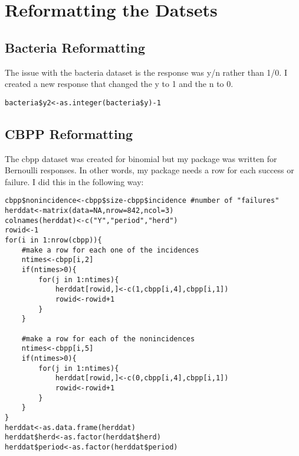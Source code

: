 \documentclass{article}
\begin{document}
\section{Reformatting the Datsets}
\subsection{Bacteria Reformatting}
The issue with the bacteria dataset is the response was y/n rather than 1/0. I created a new response that changed the y to 1 and the n to 0.

\begin{verbatim}
bacteria$y2<-as.integer(bacteria$y)-1
\end{verbatim}
\subsection{CBPP Reformatting}
The cbpp dataset was created for binomial but my package was written for Bernoulli responses. In other words, my package needs a row for each success or failure. I did this in the following way:
\begin{verbatim}
cbpp$nonincidence<-cbpp$size-cbpp$incidence #number of "failures"
herddat<-matrix(data=NA,nrow=842,ncol=3)
colnames(herddat)<-c("Y","period","herd")
rowid<-1
for(i in 1:nrow(cbpp)){
	#make a row for each one of the incidences 
	ntimes<-cbpp[i,2]
	if(ntimes>0){	
		for(j in 1:ntimes){
			herddat[rowid,]<-c(1,cbpp[i,4],cbpp[i,1])
			rowid<-rowid+1
		}
	}
	
	#make a row for each of the nonincidences
	ntimes<-cbpp[i,5]
	if(ntimes>0){	
		for(j in 1:ntimes){
			herddat[rowid,]<-c(0,cbpp[i,4],cbpp[i,1])
			rowid<-rowid+1
		}
	}
}
herddat<-as.data.frame(herddat)
herddat$herd<-as.factor(herddat$herd)
herddat$period<-as.factor(herddat$period)
\end{verbatim}
\end{document}
